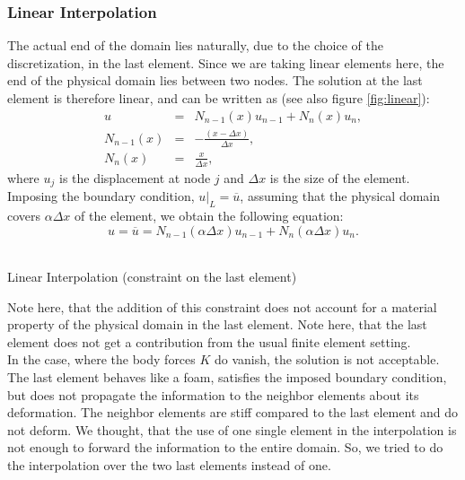 \documentclass[a4paper,12pt]{article}
\makeatletter
\newenvironment{figurehere}
  {\def\@captype{figure}}
  {}
\makeatother
\begin{document}
\subsubsection{Linear Interpolation}
The actual end of the domain lies naturally, due to the choice of the discretization, in the last element. Since we are taking linear elements here, the end of the physical domain lies between two nodes. The solution at the last element is therefore linear, and can be written as (see also figure \ref{fig:linear}):
\begin{eqnarray}
u &=& N_{n-1}(x)u_{n-1}+N_n(x)u_n,\\
N_{n-1}(x) &=& -\frac{(x-\Delta x)}{\Delta x},\\
N_{n}(x) &=& \frac{x}{\Delta x},
\end{eqnarray}
where $u_j$ is the displacement at node $j$ and $\Delta x$ is the size of the element.\\
Imposing the boundary condition, $u\vert_L = \overline{u}$, assuming that the physical domain covers $\alpha \Delta x$ of the element, we obtain the following equation:
\begin{equation}
u = \overline{u} = N_{n-1}(\alpha \Delta x)u_{n-1}+N_n(\alpha \Delta x)u_n.
\end{equation}
\begin{center}
\begin{figurehere} 
\scalebox{0.7}{}\\
\caption{Linear Interpolation (constraint on the last element)}\label{fig:linear}
\end{figurehere}
\end{center}
Note here, that the addition of this constraint does not account for a material property of the physical domain in the last element. Note here, that the last element does not get a contribution from the usual finite element setting.\\
In the case, where the body forces $K$ do vanish, the solution is not acceptable. The last element behaves like a foam, satisfies the imposed boundary condition, but does not propagate the information to the neighbor elements about its deformation. The neighbor elements are stiff compared to the last element and do not deform. We thought, that the use of one single element in the interpolation is not enough to forward the information to the entire domain. So, we tried to do the interpolation over the two last elements instead of one.
\end{document}
